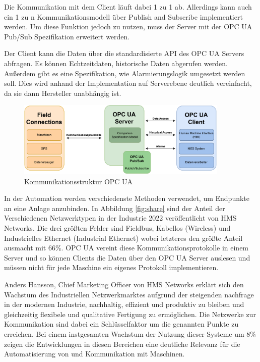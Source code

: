 \documentclass[a4paper, 12pt, oneside]{scrbook}
\begin{document}
		Die Kommunikation mit dem Client läuft dabei 1 zu 1 ab. Allerdings kann auch ein 1 zu n Kommunikationsmodell über Publish and Subscribe implementiert werden. Um diese Funktion jedoch zu nutzen, muss der Server mit der OPC UA Pub/Sub Spezifikation erweitert werden. \cite{mielebacher_verteilte_2021}
		
		Der Client kann die Daten über die standardisierte API des OPC UA Servers abfragen. Es können Echtzeitdaten, historische Daten abgerufen werden. Außerdem gibt es eine Spezifikation, wie Alarmierungslogik umgesetzt werden soll. Dies wird anhand der Implementation auf Serverebene deutlich vereinfacht, da sie dann Hersteller unabhängig ist. \cite{rinke_was_2022}
		
		\begin{figure}[H]
			\centering
			\includegraphics[width=0.9\textwidth]{res/diagramms/OPCUA.pdf}
			\caption{Kommunikationsstruktur OPC UA}
			\label{fig:OPCUA_Structure}
		\end{figure}
		
		In der Automation werden verschiedenste Methoden verwendet, um Endpunkte an eine Anlage anzubinden. In Abbildung \ref{fig:share} sind der Anteil der Verschiedenen Netzwerktypen in der Industrie 2022 veröffentlicht von HMS Networks. Die drei größten Felder sind Fieldbus, Kabellos (Wireless) und Industrielles Ethernet (Industrial Ethernet) wobei letzteres den größte Anteil ausmacht mit 66\%. OPC UA vereint diese Kommunikationsprotokolle in einem Server und so können Clients die Daten über den OPC UA Server auslesen und müssen nicht für jede Maschine ein eigenes Protokoll implementieren. \cite{noauthor_2022_nodate}
		
		Anders Hansson, Chief Marketing Officer von HMS Networks erklärt sich den Wachstum des Industriellen Netzwerkmarktes aufgrund der steigenden nachfrage in der modernen Industrie, nachhaltig, effizient und produktiv zu bleiben und gleichzeitig flexibele und qualitative Fertigung zu ermöglichen. Die Netzwerke zur Kommunikation sind dabei ein Schlüsselfaktor um die genannten Punkte zu erreichen. \cite{noauthor_2022_nodate}Bei einem instgesamten Wachstum der Nutzung dieser Systeme um 8\% zeigen die Entwicklungen in diesen Bereichen eine deutliche Relevanz für die Automatisierung von und Kommunikation mit Maschinen. 
		
\end{document}
